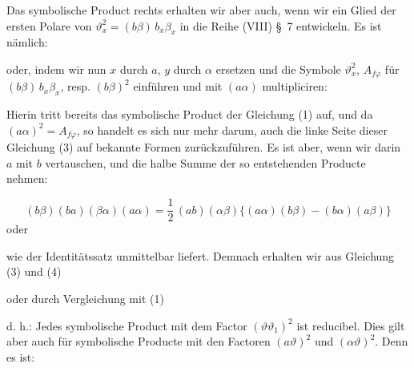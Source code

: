 
Das symbolische Product rechts erhalten wir aber auch, wenn wir
ein Glied der ersten Polare von $\vartheta_x^2 = (b\beta)\,b_x\beta_x$ in die Reihe (VIII)
\S~7 entwickeln. Es ist nämlich:


oder, indem wir nun $x$ durch $a$, $y$ durch $\alpha$ ersetzen und die Symbole
$\vartheta_x^2$, $A_{f\varphi}$ für $(b\beta)\,b_x\beta_x$, resp. $(b\beta)^2$ einführen und mit $(a\alpha)$
multipliciren:


Hierin tritt bereits das symbolische Product der Gleichung (1)
auf, und da $(a\alpha)^2 = A_{f\varphi}$, so handelt es sich nur mehr darum, auch
die linke Seite dieser Gleichung (3) auf bekannte Formen zurückzuführen. Es ist aber, wenn wir darin $a$ mit $b$ vertauschen, und die
halbe Summe der so entstehenden Producte nehmen:

\[
(b\beta)(ba)(\beta\alpha)(a\alpha) = \frac{1}{2}\,(ab)(\alpha\beta)\{(a\alpha)(b\beta) - (b\alpha)(a\beta)\}
\]
oder


wie der Identitätssatz unmittelbar liefert. Demnach erhalten wir aus
Gleichung (3) und (4)


oder durch Vergleichung mit (1)


d. h.: \glqq Jedes symbolische Product mit dem Factor $(\vartheta\vartheta_1)^2$ ist
reducibel.\grqq{}
Dies gilt aber auch für symbolische Producte mit den Factoren
$(a\vartheta)^2$ und $(\alpha\vartheta)^2$. Denn es ist:


